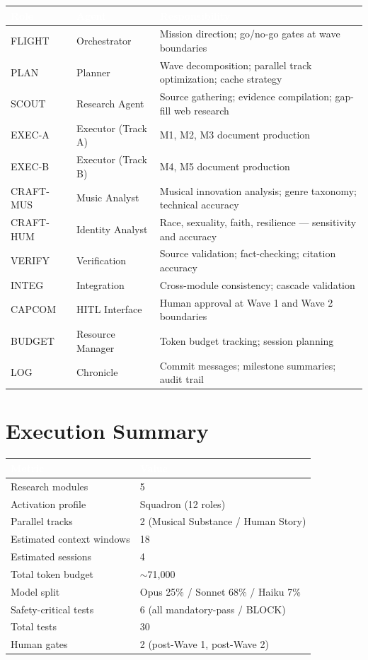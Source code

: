 \documentclass[11pt,letterpaper]{article}
\newcommand{\tableheader}[1]{\textbf{\sffamily\textcolor{white}{#1}}}
\begin{document}
\begin{center}
\begin{tabularx}{\textwidth}{L{2cm}L{3cm}X}
\toprule
{}
\tableheader{Role} & \tableheader{Agent} & \tableheader{Responsibility} \\
\midrule
FLIGHT & Orchestrator & Mission direction; go/no-go gates at wave boundaries \\
PLAN & Planner & Wave decomposition; parallel track optimization; cache strategy \\
SCOUT & Research Agent & Source gathering; evidence compilation; gap-fill web research \\
EXEC-A & Executor (Track A) & M1, M2, M3 document production \\
EXEC-B & Executor (Track B) & M4, M5 document production \\
CRAFT-MUS & Music Analyst & Musical innovation analysis; genre taxonomy; technical accuracy \\
CRAFT-HUM & Identity Analyst & Race, sexuality, faith, resilience --- sensitivity and accuracy \\
VERIFY & Verification & Source validation; fact-checking; citation accuracy \\
INTEG & Integration & Cross-module consistency; cascade validation \\
CAPCOM & HITL Interface & Human approval at Wave 1 and Wave 2 boundaries \\
BUDGET & Resource Manager & Token budget tracking; session planning \\
LOG & Chronicle & Commit messages; milestone summaries; audit trail \\
\bottomrule
\end{tabularx}
\end{center}

\section{Execution Summary}

\begin{center}
\begin{tabularx}{\textwidth}{L{5cm}X}
\toprule
{}
\tableheader{Metric} & \tableheader{Value} \\
\midrule
Research modules & 5 \\
Activation profile & Squadron (12 roles) \\
Parallel tracks & 2 (Musical Substance / Human Story) \\
Estimated context windows & 18 \\
Estimated sessions & 4 \\
Total token budget & $\sim$71,000 \\
Model split & Opus 25\% / Sonnet 68\% / Haiku 7\% \\
Safety-critical tests & 6 (all mandatory-pass / BLOCK) \\
Total tests & 30 \\
Human gates & 2 (post-Wave 1, post-Wave 2) \\
\bottomrule
\end{tabularx}
\end{center}
\end{document}
